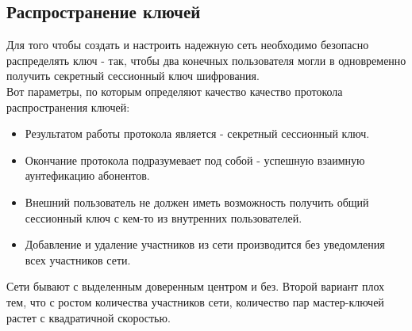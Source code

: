 \documentclass[a4paper]{article}
\begin{document}
\subsection{Распространение ключей}
Для того чтобы создать и настроить надежную сеть необходимо безопасно распределять ключ - так, чтобы два конечных пользователя могли в одновременно получить секретный сессионный ключ шифрования. \\
Вот параметры, по которым определяют качество качество протокола распространения ключей:
\begin{itemize}
    \item Результатом работы протокола является - секретный сессионный ключ.
    \item Окончание протокола подразумевает под собой - успешную взаимную аунтефикацию абонентов.
    \item Внешний пользователь не должен иметь возможность получить общий сессионный ключ с кем-то из внутренних пользователей.
    \item Добавление и удаление участников из сети производится без уведомления всех участников сети.
\end{itemize}
Сети бывают с выделенным доверенным центром и без. Второй вариант плох тем, что с ростом количества участников сети, количество пар мастер-ключей растет с квадратичной скоростью.
\end{document}
